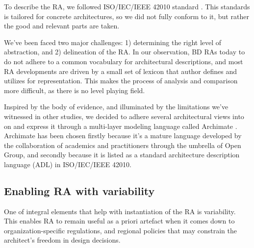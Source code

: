 \documentclass[runningheads]{llncs}
\begin{document}
To describe the RA, we followed ISO/IEC/IEEE 42010 standard \cite{ISO42010}. This standards is tailored for concrete architectures, so we did not fully conform to it, but rather the good and relevant parts are taken. 




We've been faced two major challenges: 1) determining the right level of abstraction, and 2) delineation of the RA. In our observation, BD RAs today to do not adhere to a common vocabulary for architectural descriptions, and most RA developments are driven by a small set of lexicon that author defines and utilizes for representation. This makes the process of analysis and comparison more difficult, as there is no level playing field. 

Inspired by the body of evidence, and illuminated by the limitations we've witnessed in other studies, we decided to adhere several architectural views into on and express it through a multi-layer modeling language called Archimate \cite{lankhorst2010anatomy}. Archimate has been chosen firstly because it's a mature language developed by the collaboration of academics and practitioners through the umbrella of Open Group, and secondly because it is listed as a standard architecture description language (ADL) in ISO/IEC/IEEE 42010. 

\subsection{Enabling RA with variability}

One of integral elements that help with instantiation of the RA is variability. This enables RA to remain useful as a priori artefact when it comes down to organization-specific regulations, and regional policies that may constrain the architect's freedom in design decisions. 
\end{document}
